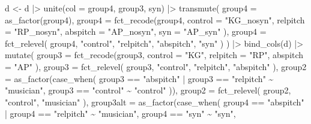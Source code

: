 \documentclass[
  man,floatsintext]{apa7}
\newenvironment{Shaded}{\begin{snugshade}}{\end{snugshade}}
\newcommand{\AttributeTok}[1]{\textcolor[rgb]{0.77,0.63,0.00}{#1}}
\newcommand{\FunctionTok}[1]{\textcolor[rgb]{0.00,0.00,0.00}{#1}}
\newcommand{\NormalTok}[1]{#1}
\newcommand{\OtherTok}[1]{\textcolor[rgb]{0.56,0.35,0.01}{#1}}
\newcommand{\SpecialCharTok}[1]{\textcolor[rgb]{0.00,0.00,0.00}{#1}}
\newcommand{\StringTok}[1]{\textcolor[rgb]{0.31,0.60,0.02}{#1}}
\begin{document}
\begin{Shaded}
\begin{Highlighting}[]
\NormalTok{d }\OtherTok{\textless{}{-}}\NormalTok{ d }\SpecialCharTok{|\textgreater{}}
  \FunctionTok{unite}\NormalTok{(}\AttributeTok{col =}\NormalTok{ group4, group3, syn) }\SpecialCharTok{|\textgreater{}}
  \FunctionTok{transmute}\NormalTok{(}
    \AttributeTok{group4 =} \FunctionTok{as\_factor}\NormalTok{(group4),}
    \AttributeTok{group4 =} \FunctionTok{fct\_recode}\NormalTok{(group4,}
      \AttributeTok{control =} \StringTok{"KG\_nosyn"}\NormalTok{,}
      \AttributeTok{relpitch =} \StringTok{"RP\_nosyn"}\NormalTok{,}
      \AttributeTok{abspitch =} \StringTok{"AP\_nosyn"}\NormalTok{,}
      \AttributeTok{syn =} \StringTok{"AP\_syn"}
\NormalTok{    ),}
    \AttributeTok{group4 =} \FunctionTok{fct\_relevel}\NormalTok{(}
\NormalTok{      group4, }\StringTok{"control"}\NormalTok{, }\StringTok{"relpitch"}\NormalTok{,}
      \StringTok{"abspitch"}\NormalTok{, }\StringTok{"syn"}
\NormalTok{    )}
\NormalTok{  ) }\SpecialCharTok{|\textgreater{}}
  \FunctionTok{bind\_cols}\NormalTok{(d) }\SpecialCharTok{|\textgreater{}}
  \FunctionTok{mutate}\NormalTok{(}
    \AttributeTok{group3 =} \FunctionTok{fct\_recode}\NormalTok{(group3,}
      \AttributeTok{control =} \StringTok{"KG"}\NormalTok{,}
      \AttributeTok{relpitch =} \StringTok{"RP"}\NormalTok{,}
      \AttributeTok{abspitch =} \StringTok{"AP"}
\NormalTok{    ),}
    \AttributeTok{group3 =} \FunctionTok{fct\_relevel}\NormalTok{(}
\NormalTok{      group3, }\StringTok{"control"}\NormalTok{, }\StringTok{"relpitch"}\NormalTok{,}
      \StringTok{"abspitch"}
\NormalTok{    ),}
    \AttributeTok{group2 =} \FunctionTok{as\_factor}\NormalTok{(}\FunctionTok{case\_when}\NormalTok{(}
\NormalTok{      group3 }\SpecialCharTok{==} \StringTok{"abspitch"} \SpecialCharTok{|}\NormalTok{ group3 }\SpecialCharTok{==} \StringTok{"relpitch"} \SpecialCharTok{\textasciitilde{}} \StringTok{"musician"}\NormalTok{,}
\NormalTok{      group3 }\SpecialCharTok{==} \StringTok{"control"} \SpecialCharTok{\textasciitilde{}} \StringTok{"control"}
\NormalTok{    )),}
    \AttributeTok{group2 =} \FunctionTok{fct\_relevel}\NormalTok{(}
\NormalTok{      group2, }\StringTok{"control"}\NormalTok{, }\StringTok{"musician"}
\NormalTok{    ),}
    \AttributeTok{group3alt =} \FunctionTok{as\_factor}\NormalTok{(}\FunctionTok{case\_when}\NormalTok{(}
\NormalTok{      group4 }\SpecialCharTok{==} \StringTok{"abspitch"} \SpecialCharTok{|}\NormalTok{ group4 }\SpecialCharTok{==} \StringTok{"relpitch"} \SpecialCharTok{\textasciitilde{}} \StringTok{"musician"}\NormalTok{,}
\NormalTok{      group4 }\SpecialCharTok{==} \StringTok{"syn"} \SpecialCharTok{\textasciitilde{}} \StringTok{"syn"}\NormalTok{,}

\end{Highlighting}
\end{Shaded}
\end{document}
